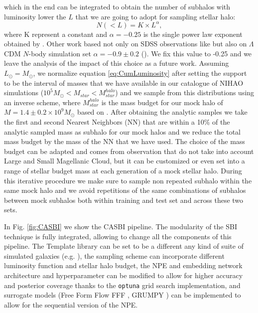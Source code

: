 which in the end can be integrated to obtain the number of subhalos with luminosity lower the $L$ that we are going to adopt for sampling stellar halo:
\begin{equation}
    N(<L) = K \times L^{\alpha},
\label{eq:CumLuminosity}
\end{equation}
where K represent a constant and $\alpha=-0.25$ is the single power law exponent obtained by \cite{koposovLuminosityFunctionMilky2008}. Other work based not only on SDSS observations like \cite{koposovLuminosityFunctionMilky2008} but also on $\Lambda$CDM $N$-body simulation set $\alpha = -0.9 \pm 0.2$ (\cite{tollerudHundredsMilkyWay2008}). We fix this value to -0.25 and we leave the analysis of the impact of this choice as a future work.
Assuming $L_\odot = M_\odot$, we normalize equation \ref{eq:CumLuminosity} after setting the support to be the interval of masses that we have available in our catalogue of NIHAO simulations ($10^5 M_\odot < M_{star} < M_{star}^{halo}$) and we sample from this distributions using an inverse scheme, where $ M_{star}^{halo}$ is the mass budget for our mock halo of $M=1.4 \pm 0.2 \times 10^9 M_\odot$ based on \cite{deasonTotalStellarHalo2019}. After obtaining the analytic samples we take the first and second Nearest Neighbors (NN) that are within a 10\% of the analytic sampled mass as subhalo for our mock halos and we reduce the total mass budget by the mass of the NN that we have used. The choice of the mass budget can be adapted and comes from observation that do not take into account Large and Small Magellanic Cloud, but it can be customized or even set into a range of stellar budget mass at each generation of a mock stellar halo. During this iterative procedure we make sure to sample non repeated subhalo within the same mock halo and we avoid repetitions of the same combinations of subhalos between mock subhalos both within training and test set and across these two sets.

In Fig. \ref{fig:CASBI} we show the CASBI pipeline. The modularity of the SBI technique is fully integrated, allowing to change all the components of this pipeline. The Template library can be set to be a different any kind of suite of simulated galaxies (e.g. \cite{pillepichMilkyWayAndromeda2023}), the sampling scheme can incorporate different luminosity function and stellar halo budget, the NPE and embedding network architecture and hyperparameter can be modified to allow for higher accuracy and posterior coverage thanks to the \texttt{optuna} grid search implementation, and surrogate models (Free Form Flow FFF \cite{draxlerFreeformFlowsMake2024}, GRUMPY \cite{kravtsovGRUMPYSimpleFramework2022}) can be implemented to allow for the sequential version of the NPE.      


